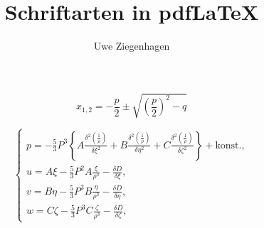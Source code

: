 \documentclass[12pt,ngerman,parskip=half]{scrartcl}
\title{Schriftarten in pdf\LaTeX}
\author{Uwe Ziegenhagen}
\begin{document}
\maketitle


\blindtext

\blindtext

\begin{equation}
x_{1,2} = -\frac{p}{2} \pm \sqrt{  \left( \frac{p}{2} \right) ^2 - q  }
\end{equation}


\blindtext

\begin{equation}
\left\{
\begin{array}{l}
p = - \frac{5}{3} P^3 \left\{A \frac{\delta^2 \left(\frac{1}{\rho} \right)}{\delta \xi^2} + B  \frac{\delta^2 \left(\frac{1}{\rho} \right)}{\delta \eta^2} + C \frac{\delta^2 \left(\frac{1}{\rho} \right)}{\delta \zeta^2} \right\} + \text{konst.}, \\
u = A \xi - \frac{5}{3} P^2 A \frac{\xi}{\rho^3} - \frac{\delta D}{\delta \xi}, \\
v = B \eta - \frac{5}{3} P^3 B \frac{\eta}{\rho^3} - \frac{\delta D}{\delta \eta}, \\
w = C \zeta - \frac{5}{3} P^3 C \frac{\zeta}{\rho^3} - \frac{\delta D}{\delta \zeta},
\end{array}
\right.
\end{equation}


\blindtext

\blindtext
\end{document}

